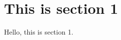 \documentclass[../main.tex]{subfiles} %
\begin{document}
\section{This is section 1}

Hello, this is section 1.
\end{document}
